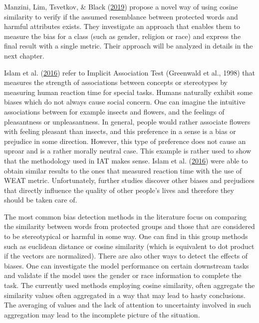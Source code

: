 \documentclass[12pt,]{book}
\begin{document}
Manzini, Lim, Tsvetkov, \& Black
(\protect\hyperlink{ref-Manzini2019blackToCriminal}{2019}) propose a
novel way of using cosine similarity to verify if the assumed
resemblance between protected words and harmful attributes exists. They
investigate an approach that enables them to measure the bias for a
class (such as gender, religion or race) and express the final result
with a single metric. Their approach will be analyzed in details in the
next chapter.

Islam et al. (\protect\hyperlink{ref-Caliskan2017Semantics}{2016}) refer
to Implicit Association Test (Greenwald et al., 1998) that measures the
strength of associations between concepts or stereotypes by measuring
human reaction time for special tasks. Humans naturally exhibit some
biases which do not always cause social concern. One can imagine the
intuitive associations between for example insects and flowers, and the
feelings of pleasantness or unpleasantness. In general, people would
rather associate flowers with feeling pleasant than insects, and this
preference in a sense is a bias or prejudice in some direction. However,
this type of preference does not cause an uproar and is a rather morally
neutral case. This example is rather used to show that the methodology
used in IAT makes sense. Islam et al.
(\protect\hyperlink{ref-Caliskan2017Semantics}{2016}) were able to
obtain similar results to the ones that measured reaction time with the
use of WEAT metric. Unfortunately, further studies discover other biases
and prejudices that directly influence the quality of other people's
lives and therefore they should be taken care of.

The most common bias detection methods in the literature focus on
comparing the similarity between words from protected groups and those
that are considered to be stereotypical or harmful in some way. One can
find in this group methods such as euclidean distance or cosine
similarity (which is equivalent to dot product if the vectors are
normalized). There are also other ways to detect the effects of biases.
One can investigate the model performance on certain downstream tasks
and validate if the model uses the gender or race information to
complete the task. The currently used methods employing cosine
similarity, often aggregate the similarity values often aggregated in a
way that may lead to hasty conclusions. The averaging of values and the
lack of attention to uncertainty involved in such aggregation may lead
to the incomplete picture of the situation.
\end{document}
